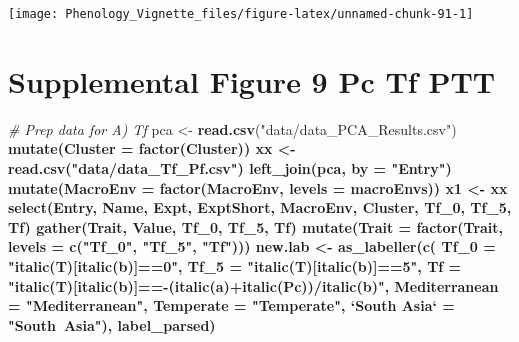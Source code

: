 \documentclass[
]{article}
\newenvironment{Shaded}{\begin{snugshade}}{\end{snugshade}}
\newcommand{\CommentTok}[1]{\textcolor[rgb]{0.56,0.35,0.01}{\textit{#1}}}
\newcommand{\DataTypeTok}[1]{\textcolor[rgb]{0.13,0.29,0.53}{#1}}
\newcommand{\DecValTok}[1]{\textcolor[rgb]{0.00,0.00,0.81}{#1}}
\newcommand{\KeywordTok}[1]{\textcolor[rgb]{0.13,0.29,0.53}{\textbf{#1}}}
\newcommand{\NormalTok}[1]{#1}
\newcommand{\OperatorTok}[1]{\textcolor[rgb]{0.81,0.36,0.00}{\textbf{#1}}}
\newcommand{\StringTok}[1]{\textcolor[rgb]{0.31,0.60,0.02}{#1}}
\begin{document}
\texttt{[image: Phenology\_Vignette\_files/figure-latex/unnamed-chunk-91-1]}

\hypertarget{supplemental-figure-9-pc-tf-ptt}{%
\section{Supplemental Figure 9 Pc Tf
PTT}\label{supplemental-figure-9-pc-tf-ptt}}

\begin{Shaded}
\begin{Highlighting}[]
\CommentTok{# Prep data for A) Tf}
\NormalTok{pca <-}\StringTok{ }\KeywordTok{read.csv}\NormalTok{(}\StringTok{"data/data_PCA_Results.csv"}\NormalTok{) }\OperatorTok{%
\StringTok{  }\KeywordTok{mutate}\NormalTok{(}\DataTypeTok{Cluster =} \KeywordTok{factor}\NormalTok{(Cluster))}
\NormalTok{xx <-}\StringTok{ }\KeywordTok{read.csv}\NormalTok{(}\StringTok{"data/data_Tf_Pf.csv"}\NormalTok{) }\OperatorTok{%
\StringTok{  }\KeywordTok{left_join}\NormalTok{(pca, }\DataTypeTok{by =} \StringTok{"Entry"}\NormalTok{) }\OperatorTok{%
\StringTok{  }\KeywordTok{mutate}\NormalTok{(}\DataTypeTok{MacroEnv =} \KeywordTok{factor}\NormalTok{(MacroEnv, }\DataTypeTok{levels =}\NormalTok{ macroEnvs))}
\NormalTok{x1 <-}\StringTok{ }\NormalTok{xx }\OperatorTok{%
\StringTok{  }\KeywordTok{select}\NormalTok{(Entry, Name, Expt, ExptShort, MacroEnv, Cluster, Tf_}\DecValTok{0}\NormalTok{, Tf_}\DecValTok{5}\NormalTok{, Tf) }\OperatorTok{%
\StringTok{  }\KeywordTok{gather}\NormalTok{(Trait, Value, Tf_}\DecValTok{0}\NormalTok{, Tf_}\DecValTok{5}\NormalTok{, Tf) }\OperatorTok{%
\StringTok{  }\KeywordTok{mutate}\NormalTok{(}\DataTypeTok{Trait =} \KeywordTok{factor}\NormalTok{(Trait, }\DataTypeTok{levels =} \KeywordTok{c}\NormalTok{(}\StringTok{"Tf_0"}\NormalTok{, }\StringTok{"Tf_5"}\NormalTok{, }\StringTok{"Tf"}\NormalTok{)))}
\NormalTok{new.lab <-}\StringTok{ }\KeywordTok{as_labeller}\NormalTok{(}\KeywordTok{c}\NormalTok{(}
  \DataTypeTok{Tf_0 =} \StringTok{"italic(T)[italic(b)]==0"}\NormalTok{, }\DataTypeTok{Tf_5 =} \StringTok{"italic(T)[italic(b)]==5"}\NormalTok{,}
  \DataTypeTok{Tf =} \StringTok{"italic(T)[italic(b)]==-(italic(a)+italic(Pc))/italic(b)"}\NormalTok{, }
  \DataTypeTok{Mediterranean =} \StringTok{"Mediterranean"}\NormalTok{, }\DataTypeTok{Temperate =} \StringTok{"Temperate"}\NormalTok{, }
  \StringTok{`}\DataTypeTok{South Asia}\StringTok{`}\NormalTok{ =}\StringTok{ "South~Asia"}\NormalTok{), label_parsed)}
}}}}}}
\end{Highlighting}
\end{Shaded}
\end{document}
